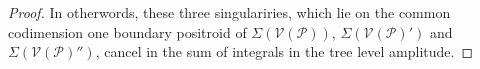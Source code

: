 \documentclass[11pt]{article}
\newcommand{\drawWLD}[2]{

\pgfmathsetmacro{\n}{#1}
\pgfmathsetmacro{\radius}{#2}
\pgfmathsetmacro{\angle}{360/\n}
\draw (0,0) circle (\radius);
    \foreach \i in {1,2,...,\n} {
      \draw (\angle*\i:\radius) node {$\bullet$};
    }

}
\newcommand{\drawprop}[4]{
\pgfmathsetmacro{\r}{#1}
\pgfmathsetmacro{\bumpr}{#2}
\pgfmathsetmacro{\s}{#3}
\pgfmathsetmacro{\bumps}{#4}
\pgfmathsetmacro{\perturbe}{\angle/\n}
\begin{scope}
\draw[smallpropagator] (\angle*\r + \angle/2 + \bumpr*\perturbe:\radius) -- (\angle*\s + \angle/2 + \bumps*\perturbe:\radius);
\end{scope}
}
\newcommand{\modifiedprop}[5]{
\pgfmathsetmacro{\r}{#1}
\pgfmathsetmacro{\bumpr}{#2}
\pgfmathsetmacro{\s}{#3}
\pgfmathsetmacro{\bumps}{#4}
\pgfmathsetmacro{\perturbe}{\angle/\n}

\begin{scope}
\clip (\angle*\r:\radius) -- (\angle + \angle*\r:\radius) -- (\angle*\s:\radius) -- (\angle + \angle*\s:\radius) -- (\angle*\r:\radius);
\draw[#5] (\angle*\r + \angle/2 + \bumpr*\perturbe:\radius) -- (\angle*\s + \angle/2 + \bumps*\perturbe:\radius);
\end{scope}
}
\newcommand{\drawnumbers}{
  \foreach \i in {1,2,...,\n} {
  \pgfmathsetmacro{\x}{\angle*\i}
  \draw (\x:\radius*1.25) node {\footnotesize \i};
}
}
\newcommand{\cP}{\mathcal{P}}
\newcommand{\cV}{\mathcal{V}}
\newcommand{\VP}{\cV(\cP)}
\theoremstyle{remark}
\theoremstyle{definition}
\begin{document}
\begin{proof}
\begin{comment}
        \drawprop{5}{0}{8}{-1}
		\end{scope}
	\end{tikzpicture} \leftrightarrow \begin{tikzpicture}[rotate=67.5,baseline=(current bounding box.east)]
	\begin{scope}
	\drawWLD{10}{1.5}
	\drawnumbers
	\modifiedprop{1}{0}{8}{1}{propagator, dashed}
	\modifiedprop{1}{0}{3}{0}{propagator, dashed}
        \drawprop{5}{0}{8}{-1}
		\end{scope}
	\end{tikzpicture} \leftrightarrow \begin{tikzpicture}[rotate=67.5,baseline=(current bounding box.east)]
	\begin{scope}
	\drawWLD{10}{1.5}
	\drawnumbers
	\modifiedprop{1}{0}{3}{0}{propagator, dashed}
	\modifiedprop{3}{0}{8}{0}{propagator, dashed}
        \drawprop{5}{0}{8}{-1}
		\end{scope}
	\end{tikzpicture}\eas \end{comment}
In otherwords, these three singulariries, which lie on the common codimension one boundary positroid of $\Sigma(\VP)$, $\Sigma(\VP')$ and $\Sigma(\VP'')$, cancel in the sum of integrals in the tree level amplitude.


\end{proof}
\end{document}
